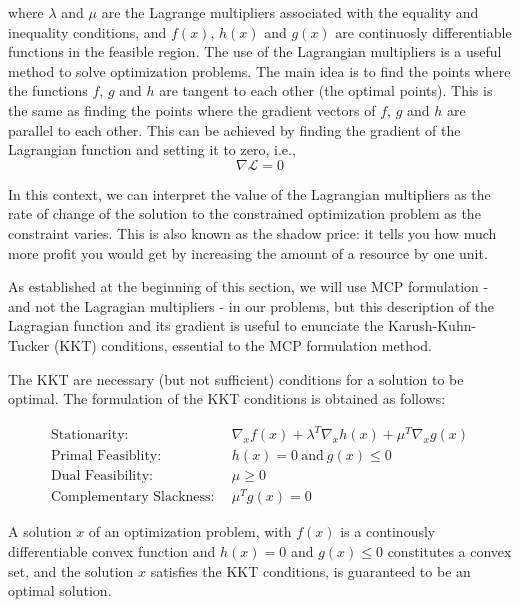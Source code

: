 \documentclass[11pt, letterpaper]{article}
\begin{document}
where $\lambda$ and $\mu$ are the Lagrange multipliers associated with the equality and inequality conditions, and $f(x)$, $h(x)$ and $g(x)$ are continuosly differentiable functions in the feasible region. The use of the Lagrangian multipliers is a useful method to solve optimization problems. The main idea is to find the points where the functions $f$, $g$ and $h$ are tangent to each other (the optimal points). This is the same as finding the points where the gradient vectors of $f$, $g$ and $h$ are parallel to each other. This can be achieved by finding the gradient of the Lagrangian function and setting it to zero, i.e.,
\begin{equation} 
     \nabla \mathcal{L} = 0
\end{equation}



In this context, we can interpret the value of the Lagrangian multipliers as the rate of change of the solution to the constrained optimization problem as the constraint varies. This is also known as the shadow price: it tells you how much more profit you would get by increasing the amount of a resource by one unit.

As established at the beginning of this section, we will use MCP formulation - and not the Lagragian multipliers - in our problems, but this description of the Lagragian function and its gradient is useful to enunciate the Karush-Kuhn-Tucker (KKT) conditions, essential to the MCP formulation method.

The KKT are necessary (but not sufficient) conditions for a solution to be optimal. The formulation of the KKT conditions is obtained as follows:

\begin{align}
    \textrm{Stationarity}: \ \  &  \nabla_x f(x) + \lambda^{T}  \nabla_x h(x) + \mu^{T} \nabla_x g(x) \\
    \textrm{Primal Feasiblity}: \ \  &  h(x)=0 \ \textrm{and} \ g(x) \leq 0  \\
    \textrm{Dual Feasibility}: \ \  & \mu \geq 0 \\
    \textrm{Complementary Slackness}: \ \  & \mu^{T} g(x) = 0 
\end{align}

A solution $x$ of an optimization problem, with $f(x)$ is a continously differentiable convex function and $h(x)=0$ and $g(x) \leq 0$ constitutes a convex set, and the solution $x$ satisfies the KKT conditions, is guaranteed to be an optimal solution.
\end{document}
